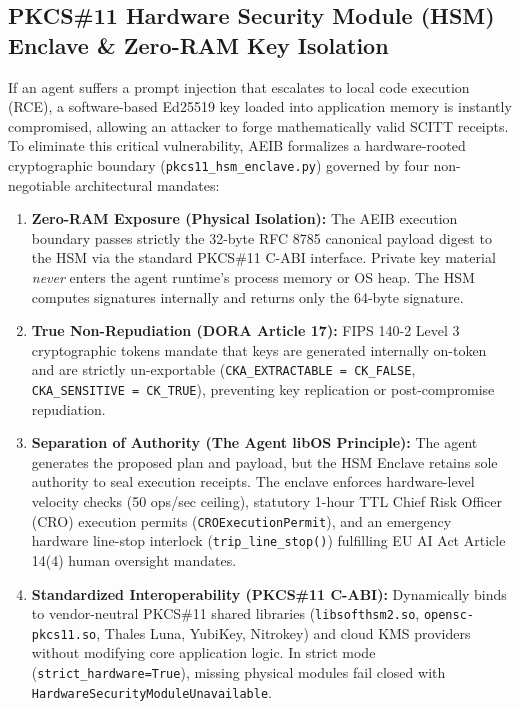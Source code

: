 \documentclass[10pt,journal,compsoc]{IEEEtran}
\begin{document}
\subsection{PKCS\#11 Hardware Security Module (HSM) Enclave \& Zero-RAM Key Isolation}
If an agent suffers a prompt injection that escalates to local code execution (RCE), a software-based Ed25519 key loaded into application memory is instantly compromised, allowing an attacker to forge mathematically valid SCITT receipts. To eliminate this critical vulnerability, AEIB formalizes a hardware-rooted cryptographic boundary (\texttt{pkcs11\_hsm\_enclave.py}) governed by four non-negotiable architectural mandates:
\begin{enumerate}
    \item \textbf{Zero-RAM Exposure (Physical Isolation):} The AEIB execution boundary passes strictly the 32-byte RFC 8785 canonical payload digest to the HSM via the standard PKCS\#11 C-ABI interface. Private key material \emph{never} enters the agent runtime's process memory or OS heap. The HSM computes signatures internally and returns only the 64-byte signature.
    \item \textbf{True Non-Repudiation (DORA Article 17):} FIPS 140-2 Level 3 cryptographic tokens mandate that keys are generated internally on-token and are strictly un-exportable (\texttt{CKA\_EXTRACTABLE = CK\_FALSE}, \texttt{CKA\_SENSITIVE = CK\_TRUE}), preventing key replication or post-compromise repudiation.
    \item \textbf{Separation of Authority (The Agent libOS Principle):} The agent generates the proposed plan and payload, but the HSM Enclave retains sole authority to seal execution receipts. The enclave enforces hardware-level velocity checks (50 ops/sec ceiling), statutory 1-hour TTL Chief Risk Officer (CRO) execution permits (\texttt{CROExecutionPermit}), and an emergency hardware line-stop interlock (\texttt{trip\_line\_stop()}) fulfilling EU AI Act Article 14(4) human oversight mandates.
    \item \textbf{Standardized Interoperability (PKCS\#11 C-ABI):} Dynamically binds to vendor-neutral PKCS\#11 shared libraries (\texttt{libsofthsm2.so}, \texttt{opensc-pkcs11.so}, Thales Luna, YubiKey, Nitrokey) and cloud KMS providers without modifying core application logic. In strict mode (\texttt{strict\_hardware=True}), missing physical modules fail closed with \texttt{HardwareSecurityModuleUnavailable}.
\end{enumerate}
\end{document}
